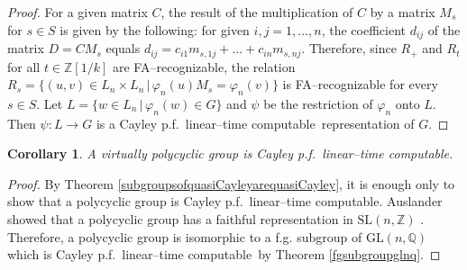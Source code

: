 \documentclass[article,12pt]{elsarticle}
\newtheorem{corollary}{Corollary}
\newcommand\linearC{Cayley p.f.~linear--time computable}
\begin{document}
\begin{proof}
	For a given matrix $C$, 
	the result of 
	the multiplication of $C$ 
	by a matrix $M_s$ for $s \in S$ is 
	given by the following: 
	for given $i,j=1,\dots, n$, the 
	coefficient $d_{ij}$ of the matrix $D = C M_s$ 
	equals 
	$d_{ij} = c_{i1} m_{s,1j} + \dots + c_{in} 
	m_{s,nj}$. 
	Therefore, since $R_+$ and 
	$R_t$ for all $t \in \mathbb{Z}\left[1/k\right]$
	are FA--recognizable, the  
	relation 
	$R_s = \{ \left(u,v \right) \in L_n \times L_n \, |\, 
	\varphi_n(u) M_s = \varphi_n (v) \}$ is 
	FA--recognizable for every $s \in S$. 
	Let $L = \{ w \in L_n \, | \, \varphi_n (w ) \in G\}$ 
	and $\psi$ be the restriction of $\varphi_n$ onto 
	$L$. Then $\psi : L \rightarrow G$ is a 
	\linearC\ representation of $G$. 	 
\end{proof} 

\begin{corollary} 
	\label{virtpolquasiCayley_cor}  
	A virtually polycyclic group is 
	\linearC. 
\end{corollary}
\begin{proof}
	By Theorem \ref{subgroupsofquasiCayleyarequasiCayley}, 
	it is enough only to show that a polycyclic group is
	\linearC. 
	Auslander showed that a polycyclic group has 
	a faithful representation in 
	$\mathrm{SL}(n,\mathbb{Z})$ 
	\cite{Auslander67}. 
	Therefore, a polycyclic group is isomorphic 
	to a f.g. subgroup of $\mathrm{GL}(n,\mathbb{Q})$
	which is \linearC\   
	by Theorem \ref{fgsubgroupglnq}.       	 
\end{proof}	
   

%
%
\end{document}
